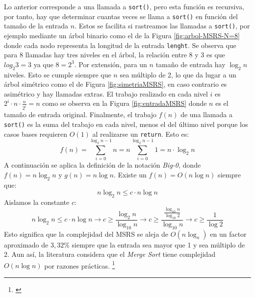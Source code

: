 \documentclass[titlepage]{article}
\begin{document}
Lo anterior corresponde a una llamada a \lstinline{sort()}, pero esta función es recursiva, por tanto, hay que determinar cuantas veces se llama a \lstinline{sort()} en función del tamaño de la entrada \(n\). Estos se facilita si rastreamos las llamadas a \lstinline{sort()}, por ejemplo mediante un árbol binario como el de la Figura \ref{fig:arbol-MSRS-N=8} donde cada nodo representa la longitud de la entrada \lstinline{lenght}. Se observa que para 8 llamadas hay tres niveles en el árbol, la relación entre 8 y 3 es que \(log_{2}{3} = 3\) ya que \(8=2^3\). Por extensión, para un \(n\) tamaño de entrada hay \(\log_{2}{n}\) niveles. Esto se cumple siempre que \(n\) sea múltiplo de 2, lo que da lugar a un árbol simétrico como el de Figura \ref{fig:simetriaMSRS}, en caso contrario es asimétrico y hay llamadas extras. El trabajo realizado en cada nivel \(i\) es \(2^i\cdot n \cdot \frac{n}{2^i} = n\) como se observa en la Figura \ref{fig:entradaMSRS} donde \(n\) es el tamaño de entrada original. Finalmente, el trabajo \(f(n)\) de una llamada a \lstinline{sort()} es la suma del trabajo en cada nivel, menos el del último nivel porque los casos bases requieren \(O(1)\) al realizarse un \lstinline{return}. Esto es:
\[f(n) = \sum_{i=0}^{\log_{2}{n} -1} {n} = n\sum_{i=0}^{\log_{2}{n} -1} {1} = n\cdot\log_{2}{n}\]
A continuación se aplica la definición de la notación \textit{Big-0}, donde \(f(n)=n\log_{2}{n}\) y \(g(n)=n\log{n}\). Existe un \(f(n)=O(n\log{n})\) siempre que: 
\[n\log_{2}{n} \leq c\cdot n\log{n}\]
Aislamos la constante \(c\):
\[n\log_{2}{n} \leq c\cdot n\log{n} \longrightarrow c \geq \frac{\log_{2}{n}} {\log_{10}{n}} \longrightarrow c \geq \frac{ \frac{\log_{10}{n}} {\log_{10}{2}} } {\log_{10}{n}} \longrightarrow c \geq \frac{1}{\log{2}} \]
Esto significa que la complejidad del MSRS se aleja de \(O(n\log_n)\) en un factor aproximado de \(3,32\%\) siempre que la entrada sea mayor que 1 y sea múltiplo de 2. Aun así, la literatura considera que el \textit{Merge Sort} tiene complejidad \(O(n\log{n})\) por razones prácticas. \footnote{\cite{Sedgewick2003-cd}}
\end{document}
